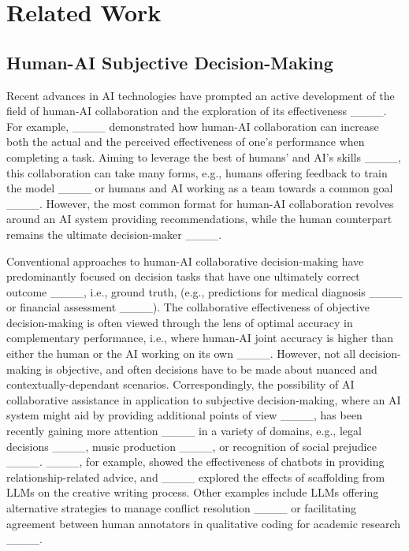 \section{Related Work}
\subsection{Human-AI Subjective Decision-Making}

Recent advances in AI technologies have prompted an active development of the field of human-AI collaboration and the exploration of its effectiveness ____. For example, ____ demonstrated how human-AI collaboration can increase both the actual and the perceived effectiveness of one's performance when completing a task.
Aiming to leverage the best of humans' and AI's skills ____, this collaboration can take many forms, e.g., humans offering feedback to train the model ____ or humans and AI working as a team towards a common goal ____. However, the most common format for human-AI collaboration revolves around an AI system providing recommendations, while the human counterpart remains the ultimate decision-maker ____. 

Conventional approaches to human-AI collaborative decision-making have predominantly focused on decision tasks that have one ultimately correct outcome ____, i.e., ground truth, (e.g., predictions for medical diagnosis ____ or financial assessment ____). 
The collaborative effectiveness of objective decision-making is often viewed through the lens of optimal accuracy in complementary performance, i.e., where human-AI joint accuracy is higher than either the human or the AI working on its own ____. 
However, not all decision-making is objective, and often decisions have to be made about nuanced and contextually-dependant scenarios.  
Correspondingly, the possibility of AI collaborative assistance in application to subjective decision-making, where an AI system might aid by providing additional points of view ____, has been recently gaining more attention ____ in a variety of domains, e.g., legal decisions ____, music production ____, or recognition of social prejudice ____. ____, for example, showed the effectiveness of chatbots in providing relationship-related advice, and ____ explored the effects of scaffolding from LLMs on the creative writing process. Other examples include LLMs offering alternative strategies to manage conflict resolution ____ or facilitating agreement between human annotators in qualitative coding for academic research ____.

